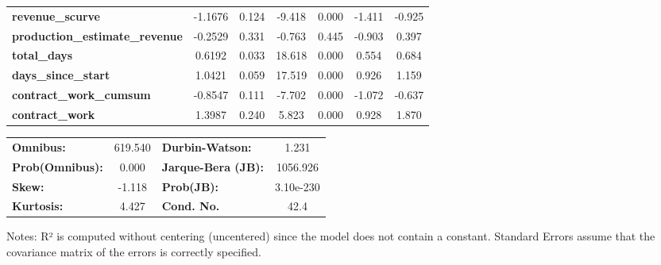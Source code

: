 \begin{center}
\begin{tabular}{lcccccc}
\textbf{revenue\_scurve}               &      -1.1676  &        0.124     &    -9.418  &         0.000        &       -1.411    &       -0.925     \\
\textbf{production\_estimate\_revenue} &      -0.2529  &        0.331     &    -0.763  &         0.445        &       -0.903    &        0.397     \\
\textbf{total\_days}                   &       0.6192  &        0.033     &    18.618  &         0.000        &        0.554    &        0.684     \\
\textbf{days\_since\_start}            &       1.0421  &        0.059     &    17.519  &         0.000        &        0.926    &        1.159     \\
\textbf{contract\_work\_cumsum}        &      -0.8547  &        0.111     &    -7.702  &         0.000        &       -1.072    &       -0.637     \\
\textbf{contract\_work}                &       1.3987  &        0.240     &     5.823  &         0.000        &        0.928    &        1.870     \\
\bottomrule
\end{tabular}
\begin{tabular}{lclc}
\textbf{Omnibus:}       & 619.540 & \textbf{  Durbin-Watson:     } &     1.231  \\
\textbf{Prob(Omnibus):} &   0.000 & \textbf{  Jarque-Bera (JB):  } &  1056.926  \\
\textbf{Skew:}          &  -1.118 & \textbf{  Prob(JB):          } & 3.10e-230  \\
\textbf{Kurtosis:}      &   4.427 & \textbf{  Cond. No.          } &      42.4  \\
\bottomrule
\end{tabular}
\end{center}

Notes: \newline
 [1] R² is computed without centering (uncentered) since the model does not contain a constant. \newline
 [2] Standard Errors assume that the covariance matrix of the errors is correctly specified.